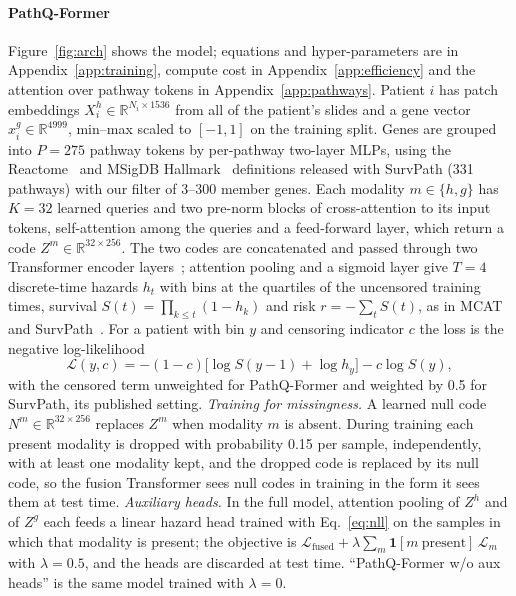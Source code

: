 \documentclass{article}
\newcommand{\pq}{PathQ-Former}
\begin{document}
\paragraph{\pq{}} Figure~\ref{fig:arch} shows the model; equations and hyper-parameters are in Appendix~\ref{app:training}, compute cost in Appendix~\ref{app:efficiency} and the attention over pathway tokens in Appendix~\ref{app:pathways}. Patient $i$ has patch embeddings $X^h_i \in \mathbb{R}^{N_i \times 1536}$ from all of the patient's slides and a gene vector $x^g_i \in \mathbb{R}^{4999}$, min--max scaled to $[-1, 1]$ on the training split. Genes are grouped into $P = 275$ pathway tokens by per-pathway two-layer MLPs, using the Reactome~\citep{gillespie2022reactome} and MSigDB Hallmark~\citep{liberzon2015hallmark} definitions released with SurvPath (331 pathways) with our filter of 3--300 member genes. Each modality $m \in \{h, g\}$ has $K = 32$ learned queries and two pre-norm blocks of cross-attention to its input tokens, self-attention among the queries and a feed-forward layer, which return a code $Z^m \in \mathbb{R}^{32 \times 256}$. The two codes are concatenated and passed through two Transformer encoder layers~\citep{vaswani2017attention}; attention pooling and a sigmoid layer give $T = 4$ discrete-time hazards $h_t$ with bins at the quartiles of the uncensored training times, survival $S(t) = \prod_{k \le t}(1 - h_k)$ and risk $r = -\sum_t S(t)$, as in MCAT and SurvPath~\citep{zadeh2021bias}. For a patient with bin $y$ and censoring indicator $c$ the loss is the negative log-likelihood
\begin{equation}
\mathcal{L}(y, c) = -(1 - c)\big[\log S(y - 1) + \log h_y\big] - c \log S(y),
\label{eq:nll}
\end{equation}
with the censored term unweighted for \pq{} and weighted by 0.5 for SurvPath, its published setting. \emph{Training for missingness.} A learned null code $N^m \in \mathbb{R}^{32 \times 256}$ replaces $Z^m$ when modality $m$ is absent. During training each present modality is dropped with probability 0.15 per sample, independently, with at least one modality kept, and the dropped code is replaced by its null code, so the fusion Transformer sees null codes in training in the form it sees them at test time. \emph{Auxiliary heads.} In the full model, attention pooling of $Z^h$ and of $Z^g$ each feeds a linear hazard head trained with Eq.~\eqref{eq:nll} on the samples in which that modality is present; the objective is $\mathcal{L}_{\text{fused}} + \lambda \sum_m \mathbf{1}[m\ \text{present}]\, \mathcal{L}_m$ with $\lambda = 0.5$, and the heads are discarded at test time. ``\pq{} w/o aux heads'' is the same model trained with $\lambda = 0$.
\end{document}
